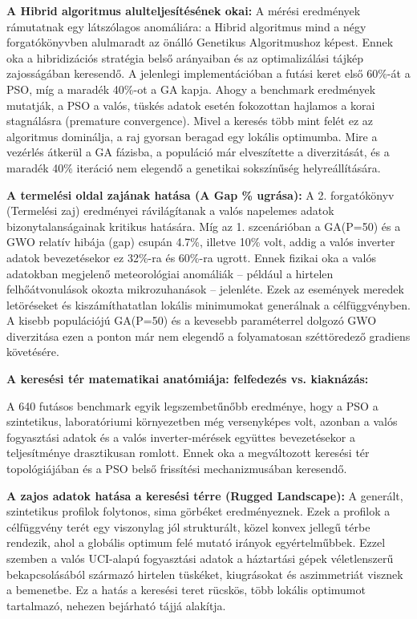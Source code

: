 \textbf{A Hibrid algoritmus alulteljesítésének okai:}
A mérési eredmények rámutatnak egy látszólagos anomáliára: a Hibrid algoritmus mind a négy forgatókönyvben alulmaradt az önálló Genetikus Algoritmushoz képest. Ennek oka a hibridizációs stratégia belső arányaiban és az optimalizálási tájkép zajosságában keresendő. A jelenlegi implementációban a futási keret első 60\%-át a PSO, míg a maradék 40\%-ot a GA kapja. Ahogy a benchmark eredmények mutatják, a PSO a valós, tüskés adatok esetén fokozottan hajlamos a korai stagnálásra (premature convergence). Mivel a keresés több mint felét ez az algoritmus dominálja, a raj gyorsan beragad egy lokális optimumba. Mire a vezérlés átkerül a GA fázisba, a populáció már elveszítette a diverzitását, és a maradék 40\% iteráció nem elegendő a genetikai sokszínűség helyreállítására.

\textbf{A termelési oldal zajának hatása (A Gap \% ugrása):}
A 2. forgatókönyv (Termelési zaj) eredményei rávilágítanak a valós napelemes adatok bizonytalanságainak kritikus hatására. Míg az 1. szcenárióban a GA(P=50) és a GWO relatív hibája (gap) csupán 4.7\%, illetve 10\% volt, addig a valós inverter adatok bevezetésekor ez 32\%-ra és 60\%-ra ugrott. Ennek fizikai oka a valós adatokban megjelenő meteorológiai anomáliák – például a hirtelen felhőátvonulások okozta mikrozuhanások – jelenléte. Ezek az események meredek letöréseket és kiszámíthatatlan lokális minimumokat generálnak a célfüggvényben. A kisebb populációjú GA(P=50) és a kevesebb paraméterrel dolgozó GWO diverzitása ezen a ponton már nem elegendő a folyamatosan széttöredező gradiens követésére.

\textbf{A keresési tér matematikai anatómiája: felfedezés vs. kiaknázás:}

A 640 futásos benchmark egyik legszembetűnőbb eredménye, hogy a PSO a szintetikus, laboratóriumi környezetben még versenyképes volt, azonban a valós fogyasztási adatok és a valós inverter-mérések együttes bevezetésekor a teljesítménye drasztikusan romlott. Ennek oka a megváltozott keresési tér topológiájában és a PSO belső frissítési mechanizmusában keresendő.

\textbf{A zajos adatok hatása a keresési térre (Rugged Landscape):}
A generált, szintetikus profilok folytonos, sima görbéket eredményeznek. Ezek a profilok a célfüggvény terét egy viszonylag jól strukturált, közel konvex jellegű térbe rendezik, ahol a globális optimum felé mutató irányok egyértelműbbek. Ezzel szemben a valós UCI-alapú fogyasztási adatok a háztartási gépek véletlenszerű bekapcsolásából származó hirtelen tüskéket, kiugrásokat és aszimmetriát visznek a bemenetbe. Ez a hatás a keresési teret rücskös, több lokális optimumot tartalmazó, nehezen bejárható tájjá alakítja.


